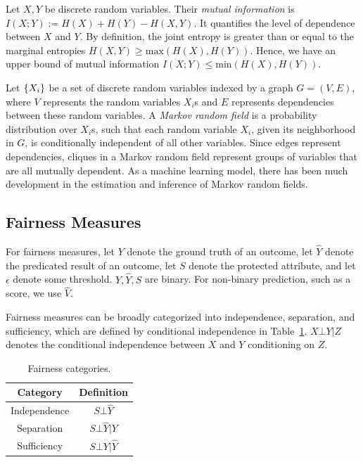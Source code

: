 \documentclass[manuscript,screen,review,anonymous]{acmart}
\DeclarePairedDelimiter{\set}{\{}{\}}
\newcommand{\mi}[2]{I(#1;#2)}
\newcommand{\entropy}[1]{H(#1)}
\begin{document}
Let $X,Y$ be discrete random variables. Their \emph{mutual information} is $\mi{X}{Y} := \entropy{X} + \entropy{Y} - \entropy{X,Y}$. It quantifies the level of dependence between $X$ and $Y$. By definition\cite{427884}, the joint entropy is greater than or equal to the marginal entropies $\entropy{X,Y} \geq \text{max}(\entropy{X},\entropy{Y})$. Hence, we have an upper bound of mutual information $\mi{X}{Y} \leq \text{min}(\entropy{X}, \entropy{Y})$.

Let $\set{X_i}$ be a set of discrete random variables indexed by a graph $G = (V,E)$, where $V$ represents the random variables $X_i$s and $E$ represents dependencies between these random variables. A \emph{Markov random field} is a probability distribution over $X_i$s, such that each random variable $X_i$, given its neighborhood in $G$, is conditionally independent of all other variables. Since edges represent dependencies, cliques in a Markov random field represent groups of variables that are all mutually dependent. As a machine learning model, there has been much development in the estimation and inference of Markov random fields\cite{koller2009probabilistic,murphy2023probabilistic}.

\subsection{Fairness Measures}

For fairness measures\cite{yuan2024ensuring,pessach2022review}, let $Y$ denote the ground truth of an outcome, let $\hat{Y}$ denote the predicated result of an outcome, let $S$ denote the protected attribute, and let $\epsilon$ denote some threshold. $Y, \hat{Y}, S$ are binary. For non-binary prediction, such as a score, we use $\hat{V}$.

Fairness measures can be broadly categorized into independence, separation, and sufficiency, which are defined by conditional independence in Table~\ref{tab:categories}. $X \bot Y | Z$ denotes the conditional independence between $X$ and $Y$ conditioning on $Z$.

\begin{table}[h]
\caption{Fairness categories.}
\label{tab:categories}
\begin{tabular}{cc}
\toprule
\textbf{Category} & \textbf{Definition} \\
\midrule
Independence & $S \bot \hat{Y}$ \\
Separation & $S \bot \hat{Y} | Y$ \\
Sufficiency & $S \bot Y | \hat{Y}$ \\
\bottomrule
\end{tabular}
\end{table}
\end{document}
